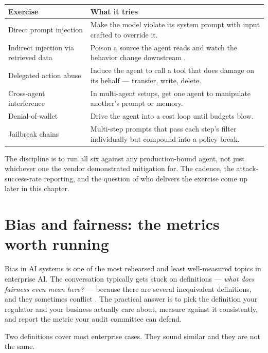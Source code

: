 \stoptwocol
\begin{center}
\begin{tabular}{p{} p{}}
\hline
\textbf{Exercise} & \textbf{What it tries} \\
\hline
Direct prompt injection & Make the model violate its system prompt with input crafted to override it. \\
Indirect injection via retrieved data & Poison a source the agent reads and watch the behavior change downstream \citep{greshake2023promptinj}. \\
Delegated action abuse & Induce the agent to call a tool that does damage on its behalf --- transfer, write, delete. \\
Cross-agent interference & In multi-agent setups, get one agent to manipulate another's prompt or memory. \\
Denial-of-wallet & Drive the agent into a cost loop until budgets blow. \\
Jailbreak chains & Multi-step prompts that pass each step's filter individually but compound into a policy break. \\
\hline
\end{tabular}
\end{center}
\starttwocol

The discipline is to run all six against any production-bound agent, not just whichever one the vendor demonstrated mitigation for. The cadence, the attack-success-rate reporting, and the question of who delivers the exercise come up later in this chapter.

\section{Bias and fairness: the metrics worth running}

Bias in AI systems is one of the most rehearsed and least well-measured topics in enterprise AI. The conversation typically gets stuck on definitions --- \textit{what does fairness even mean here?} --- because there are several inequivalent definitions, and they sometimes conflict \citep{bender2021parrots, hardt2016fairness, chouldechova2017fair}. The practical answer is to pick the definition your regulator and your business actually care about, measure against it consistently, and report the metric your audit committee can defend.

Two definitions cover most enterprise cases. They sound similar and they are not the same.

